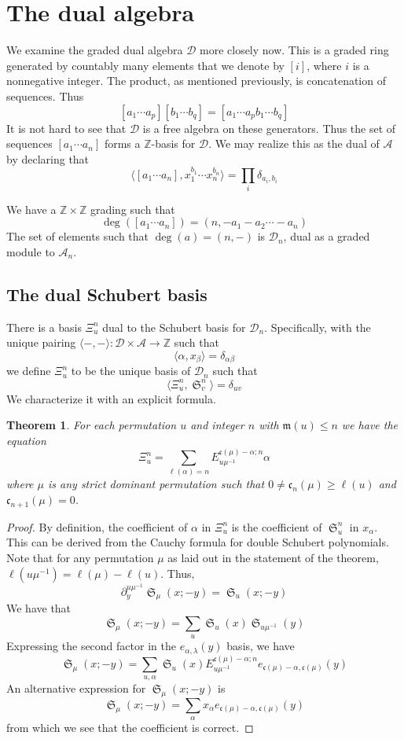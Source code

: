 \documentclass{amsart}
\newtheorem{theorem}{Theorem}[section]
\theoremstyle{definition}
\theoremstyle{remark}
\numberwithin{equation}{subsection}
\DeclareMathOperator{\sch}{\mathfrak{S}}
\newcommand{\dsch}{\ensuremath{\Xi}}
\newcommand{\coma}{\mathcal{A}}
\newcommand{\dcoma}{\mathcal{D}}
\newcommand{\code}{\mathfrak{c}}
\newcommand{\maxd}{\mathfrak{m}}
\begin{document}
\section{The dual algebra}

We examine the graded dual algebra $\dcoma$ more closely now. This is a graded ring generated by countably many elements that we denote by $[i]$, where $i$ is a nonnegative integer. The product, as mentioned previously, is concatenation of sequences. Thus
$$[a_1\cdots a_p][b_1\cdots b_q]=[a_1\cdots a_pb_1\cdots b_q]$$
It is not hard to see that $\dcoma$ is a free algebra on these generators. Thus the set of sequences $[a_1\cdots a_n]$ forms a $\mathbb{Z}$-basis for $\dcoma$. We may realize this as the dual of $\coma$ by declaring that
$$\langle [a_1\cdots a_n],x_1^{b_1}\cdots x_n^{b_n}\rangle = \prod_i\delta_{a_i,b_i}$$

We have a $\mathbb{Z}\times \mathbb{Z}$ grading such that
$$\deg([a_1\cdots a_n])=(n,-a_1-a_2\cdots-a_n)$$
The set of elements such that $\deg(a) = (n,-)$ is $\dcoma_n$, dual as a graded module to $\coma_n$.

\subsection{The dual Schubert basis}
       
There is a basis $\dsch_u^{n}$ dual to the Schubert basis for $\dcoma_n$. Specifically, with the unique pairing $\langle -,-\rangle:\dcoma\times \coma\to\mathbb{Z}$ such that
$$\langle \alpha,x_\beta\rangle = \delta_{\alpha\beta}$$
we define $\dsch_u^n$ to be the unique basis of $\dcoma_n$ such that
$$\langle \dsch_u^n,\sch_v^n\rangle = \delta_{uv}$$
We characterize it with an explicit formula.

\begin{theorem}
	For each permutation $u$ and integer $n$ with $\maxd(u)\leq n$ we have the equation
	$$\dsch_u^{n} = \sum_{\ell(\alpha)=n} E^{\code(\mu)-\alpha;n}_{u\mu^{-1}}\alpha$$
	where $\mu$ is any strict dominant permutation such that $0\neq \code_n(\mu) \geq \ell(u)$ and $\code_{n+1}(\mu)=0$.
\end{theorem}
\begin{proof}
	By definition, the coefficient of $\alpha$ in $\dsch_u^n$ is the coefficient of $\sch_u^n$ in $x_\alpha$. This can be derived from the Cauchy formula for double Schubert polynomials. Note that for any permutation $\mu$ as laid out in the statement of the theorem, $\ell(u\mu^{-1})=\ell(\mu)-\ell(u)$. Thus,
	$$\partial_y^{u\mu^{-1}}\sch_\mu(x;-y) = \sch_u(x;-y)$$
	We have that
	$$\sch_\mu(x;-y)=\sum_u \sch_u(x)\sch_{u\mu^{-1}}(y)$$
	Expressing the second factor in the $e_{\alpha,\lambda}(y)$ basis, we have
	$$\sch_\mu(x;-y)=\sum_{u,\alpha} \sch_u(x)E_{u\mu^{-1}}^{\code(\mu)-\alpha;n}e_{\code(\mu)-\alpha,\code(\mu)}(y)$$
	An alternative expression for $\sch_\mu(x;-y)$ is
	$$\sch_\mu(x;-y)=\sum_{\alpha} x_\alpha e_{\code(\mu)-\alpha,\code(\mu)}(y)$$
	from which we see that the coefficient is correct.
\end{proof}
\end{document}
